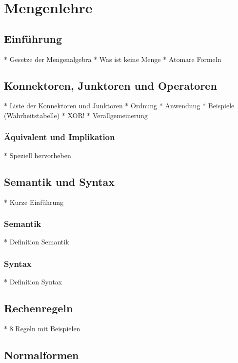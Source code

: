 \newpage

\section{Mengenlehre}

\subsection{Einführung}

* Gesetze der Mengenalgebra
* Was ist keine Menge
* Atomare Formeln

\subsection{Konnektoren, Junktoren und Operatoren}

* Liste der Konnektoren und Junktoren
* Ordnung
* Anwendung
* Beispiele (Wahrheitstabelle)
* XOR!
* Verallgemeinerung

\subsubsection{Äquivalent und Implikation}

* Speziell hervorheben

\subsection{Semantik und Syntax}

* Kurze Einführung

\subsubsection{Semantik}

* Definition Semantik

\subsubsection{Syntax}

* Definition Syntax

\subsection{Rechenregeln}

* 8 Regeln mit Beispielen

\subsection{Normalformen}

